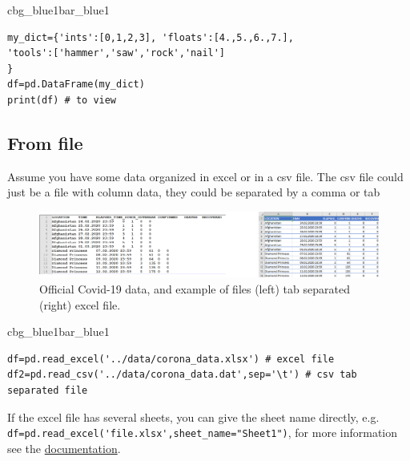 \documentclass[%
oneside,                 %
final,                   %
10pt]{article}
\newenvironment{_pro_tight}[2]{
   \def\FrameCommand{\color{#2}\vrule width 1mm\normalcolor\colorbox{#1}}
   \FrameRule0.6pt\MakeFramed {\advance\hsize-2mm\FrameRestore}\vskip3mm}
   {\vskip0mm\endMakeFramed}
\newenvironment{pro}[2]{
\bgroup\rmfamily
\fboxsep=0mm\relax
\begin{_pro_tight}{#1}{#2}
\list{}{\parsep=-2mm\parskip=0mm\topsep=0pt\leftmargin=2mm
\rightmargin=2\leftmargin\leftmargin=4pt\relax}
\item\relax}
{\endlist\end{_pro_tight}\egroup}
\begin{document}
\begin{pro}{cbg_blue1}{bar_blue1}\begin{Verbatim}[numbers=none,fontsize=\fontsize{9pt}{9pt},baselinestretch=0.95,xleftmargin=2mm]
my_dict={'ints':[0,1,2,3], 'floats':[4.,5.,6.,7.],
'tools':['hammer','saw','rock','nail']
}
df=pd.DataFrame(my_dict)
print(df) # to view

\end{Verbatim}
\end{pro}
\noindent


\subsection{From file}
Assume you have some data organized in excel or in a csv file. The csv file could just be a file with column data, they could be separated by a comma or tab

\begin{figure}[!ht]  %
  \centerline{\includegraphics[width=1.0\linewidth]{fig-pandas/covid_comb.png}}
  \caption{
  Official Covid-19 data, and example of files (left) tab separated (right) excel file. \label{fig:file}
  }
\end{figure}




\begin{pro}{cbg_blue1}{bar_blue1}\begin{Verbatim}[numbers=none,fontsize=\fontsize{9pt}{9pt},baselinestretch=0.95,xleftmargin=2mm]
df=pd.read_excel('../data/corona_data.xlsx') # excel file
df2=pd.read_csv('../data/corona_data.dat',sep='\t') # csv tab separated file

\end{Verbatim}
\end{pro}
\noindent

If the excel file has several sheets, you can give the sheet name directly, e.g. \Verb!df=pd.read_excel('file.xlsx',sheet_name="Sheet1")!, for more information see the \href{{https://pandas.pydata.org/docs/reference/api/pandas.read_excel.html}}{documentation}. 
\end{document}
